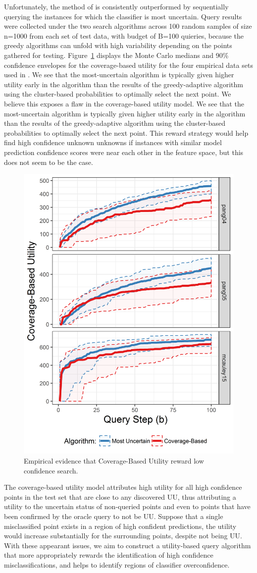 \documentclass[letterpaper]{article} %
\begin{document}
Unfortunately, the method of \citet{Bansal2018} is consistently outperformed by sequentially querying the instances for which the classifier is most uncertain. Query results were collected under the two search algorithms across 100 random samples of size n=1000 from each set of test data, with budget of B=100 quieries, because the greedy algorithms can unfold with high variability depending on the points gathered for testing. Figure~\ref{fig:coverutil} displays the Monte Carlo medians and 90\% confidence envelopes for the coverage-based utility for the four empirical data sets used in \citet{Bansal2018}. We see that the most-uncertain algorithm is typically given higher utility early in the algorithm than the results of the greedy-adaptive algorithm using the cluster-based probabilities to optimally select the next point.  We believe this exposes a flaw in the coverage-based utility model.  We see that the most-uncertain algorithm is typically given higher utility early in the algorithm than the results of the greedy-adaptive algorithm using the cluster-based probabilities to optimally select the next point. This reward strategy would help find high confidence unknown unknowns if instances with similar model prediction confidence scores were near each other in the feature space, but this does not seem to be the case.

\begin{figure}[hbtp]
  \includegraphics[width=.45\textwidth]{../experimentsAndPlots/CoverageVsMostUncertainPlaceholder.png}
  \caption{Empirical evidence that Coverage-Based Utility reward low confidence search.}
  \label{fig:coverutil}
\end{figure}

The coverage-based utility model attributes high utility for all high confidence points in the test set that are close to any discovered UU, thus attributing a utility to the uncertain status of non-queried points and even to points that have been confirmed by the oracle query to not be UU. Suppose that a single misclassified point exists in a region of high confident predictions, the utility would increase substantially for the surrounding points, despite not being UU. With these appearant issues, we aim to construct a utility-based query algorithm that more appropriately rewards the identification of high confidence misclassifications, and helps to identify regions of classifier overconfidence. 
\end{document}
